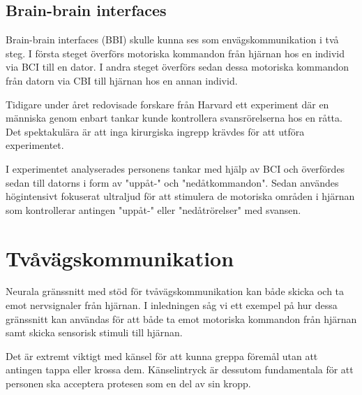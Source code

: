 \documentclass[12pt, a4paper]{article}
\begin{document}
\subsection{Brain-brain interfaces}

Brain-brain interfaces (BBI) skulle kunna ses som envägskommunikation i två
steg. I första steget överförs motoriska kommandon från hjärnan hos en individ
via BCI till en dator. I andra steget överförs sedan dessa motoriska kommandon
från datorn via CBI till hjärnan hos en annan individ.

Tidigare under året redovisade forskare från Harvard ett experiment där en
människa genom enbart tankar kunde kontrollera svansrörelserna hos en råtta. Det
spektakulära är att inga kirurgiska ingrepp krävdes för att utföra experimentet.

I experimentet analyserades personens tankar med hjälp av BCI och överfördes
sedan till datorns i form av "uppåt-" och "nedåtkommandon". Sedan användes
högintensivt fokuserat ultraljud för att stimulera de motoriska områden i
hjärnan som kontrollerar antingen "uppåt-" eller "nedåtrörelser" med svansen.
\cite{bbi}


\section{Tvåvägskommunikation}

Neurala gränssnitt med stöd för tvåvägskommunikation kan både skicka och ta emot
nervsignaler från hjärnan. I inledningen såg vi ett exempel på hur dessa
gränssnitt kan användas för att både ta emot motoriska kommandon från hjärnan
samt skicka sensorisk stimuli till hjärnan.

Det är extremt viktigt med känsel för att kunna greppa föremål utan att antingen
tappa eller krossa dem. Känselintryck är dessutom fundamentala för att personen
ska acceptera protesen som en del av sin kropp. \cite{prosthetic_operation}


%
%
%
%
%
%
%
\end{document}
